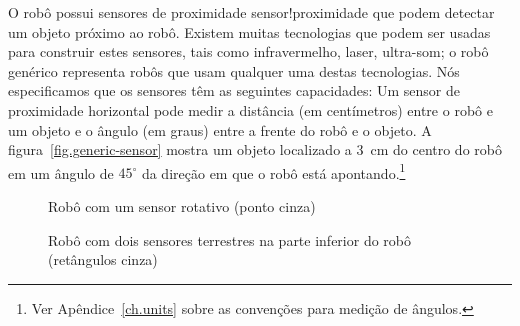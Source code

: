 O robô possui sensores de proximidade {sensor!proximidade} que podem detectar um objeto próximo ao robô. Existem muitas tecnologias que podem ser usadas para construir estes sensores, tais como infravermelho, laser, ultra-som; o robô genérico representa robôs que usam qualquer uma destas tecnologias. Nós especificamos que os sensores têm as seguintes capacidades: Um sensor de proximidade horizontal pode medir a distância (em centímetros) entre o robô e um objeto e o ângulo (em graus) entre a frente do robô e o objeto. A figura~\ref{fig.generic-sensor} mostra um objeto localizado a $3\,$ cm do centro do robô em um ângulo de $45^{\circ}$ da direção em que o robô está apontando.\footnote{Ver Apêndice~\ref{ch.units} sobre as convenções para medição de ângulos.}

\begin{figure}
\begin{minipage}{.45\textwidth}
\caption{Robô com um sensor rotativo (ponto cinza)}
\label{fig.generic-sensor}
\end{minipage}
\hspace{\fill}
\begin{minipage}{.45\textwidth}
\caption{Robô com dois sensores terrestres na parte inferior do robô (retângulos cinza)}
\label{fig.generic-ground}
\end{minipage}
\end{figure}


